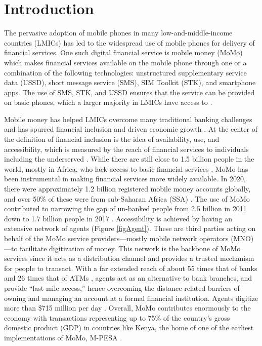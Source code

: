 \section{Introduction}
\label{Sec:Intro}
The pervasive adoption of mobile phones in many low-and-middle-income countries (LMICs) has led to the widespread use of mobile phones for delivery of financial services. One such digital financial service is mobile money (MoMo) which makes financial services available on the mobile phone through one or a combination of the following technologies: unstructured supplementary service data (USSD), short message service (SMS), SIM Toolkit (STK), and smartphone apps. The use of SMS, STK, and USSD ensures that the service can be provided on basic phones, which a larger majority in LMICs have access to \cite{silver_johnson_2018}.  

Mobile money has helped LMICs overcome many traditional banking challenges and has spurred financial inclusion and driven economic growth \cite{demirgucc2022global}. At the center of the definition of financial inclusion is the idea of availability, use, and accessibility, which is measured by the reach of financial services to individuals including the underserved \cite{demirguc2018global}. While there are still close to 1.5 billion people in the world, mostly in Africa, who lack access to basic financial services 
\cite{demirguc2018global} \cite{demirgucc2022global}, MoMo has been instrumental in making financial services more widely available. In 2020, there were approximately 1.2 billion registered mobile money accounts globally, and over 50\% of these were from sub-Saharan Africa (SSA) \cite{andersson2021state}. The use of MoMo contributed to narrowing the gap of un-banked people from 2.5 billion in 2011 down to 1.7 billion people in 2017 \cite{demirguc2018global}. Accessibility is achieved by having an extensive  network of agents (Figure \ref{figAgent}). These are third parties acting on behalf of the MoMo service providers---mostly mobile network operators (MNO)---to facilitate digitization of money. This network is the backbone of MoMo services since it acts as a distribution channel and provides a trusted mechanism for people to transact.
With a far extended reach of about 55 times that of banks and 26 times that of ATMs \cite{jakachira_andersson_2020}, agents act as an alternative to bank branches, and provide ``last-mile access,'' hence overcoming the distance-related barriers of owning and managing an account at a formal financial institution. Agents digitize more than \$715 million per day \cite{awanis2022state}. Overall, MoMo contributes enormously to the economy with transactions representing up to 75\% of the country’s gross domestic product (GDP) in  countries like Kenya, the home of one of the earliest implementations of MoMo, M-PESA \cite{creemers2020five}.

